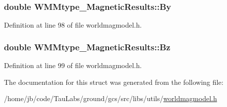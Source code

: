 \hypertarget{struct_w_m_mtype___magnetic_results_a6286c091a759e02d19c27d928e391eff}{
\subsubsection[{\-By}]{\setlength{\rightskip}{0pt plus 5cm}double {\bf \-W\-M\-Mtype\-\_\-\-Magnetic\-Results\-::\-By}}}\label{struct_w_m_mtype___magnetic_results_a6286c091a759e02d19c27d928e391eff}


\-Definition at line 98 of file worldmagmodel.\-h.

\hypertarget{struct_w_m_mtype___magnetic_results_a7b18c4cd4a4e446b117fff1f842cee83}{
\subsubsection[{\-Bz}]{\setlength{\rightskip}{0pt plus 5cm}double {\bf \-W\-M\-Mtype\-\_\-\-Magnetic\-Results\-::\-Bz}}}\label{struct_w_m_mtype___magnetic_results_a7b18c4cd4a4e446b117fff1f842cee83}


\-Definition at line 99 of file worldmagmodel.\-h.



\-The documentation for this struct was generated from the following file\-:\begin{DoxyCompactItemize}
\item 
/home/jb/code/\-Tau\-Labs/ground/gcs/src/libs/utils/\hyperlink{worldmagmodel_8h}{worldmagmodel.\-h}\end{DoxyCompactItemize}
